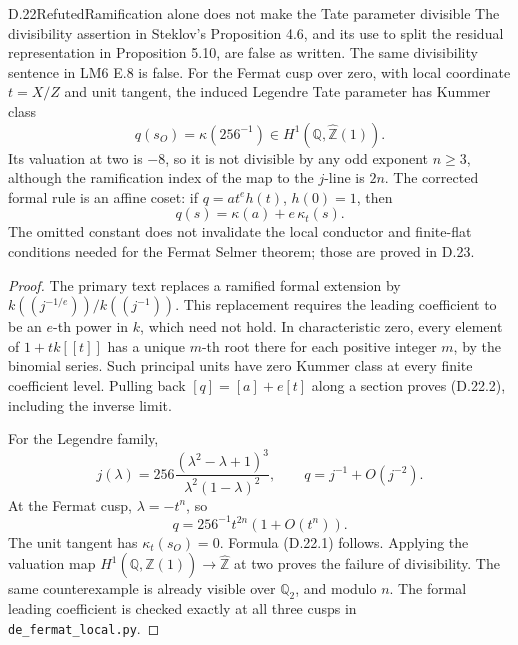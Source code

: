 \begin{statement}{D.22}{Refuted}{Ramification alone does not make the Tate parameter divisible}
The divisibility assertion in Steklov's Proposition 4.6,
and its use to split the residual representation in
Proposition 5.10, are false as written. The same
divisibility sentence in LM6 E.8 is false.
For the Fermat cusp over zero, with local coordinate
\(t=X/Z\) and unit tangent, the induced Legendre
Tate parameter has Kummer class
\[
       q(s_O)=\kappa(256^{-1})
          \in H^1(\mathbb Q,\widehat{\mathbb Z}(1)).  \tag{D.22.1}
\]
Its valuation at two is \(-8\), so it is not divisible
by any odd exponent \(n\ge3\), although the ramification
index of the map to the \(j\)-line is \(2n\).
The corrected formal rule is an affine coset:
if \(q=a t^e h(t)\), \(h(0)=1\), then
\[
          q(s)=\kappa(a)+e\,\kappa_t(s).              \tag{D.22.2}
\]
The omitted constant does not invalidate the local
conductor and finite-flat conditions needed for the
Fermat Selmer theorem; those are proved in D.23.
\end{statement}
\begin{proof}
The primary text \cite[Propositions 4.6 and 5.10]{DE_Steklov2026}
replaces a ramified formal extension by
\(k((j^{-1/e}))/k((j^{-1}))\). This replacement requires
the leading coefficient to be an \(e\)-th power in
\(k\), which need not hold. In characteristic zero,
every element of \(1+t k[[t]]\) has a unique \(m\)-th
root there for each positive integer \(m\), by the
binomial series. Such principal units have zero
Kummer class at every finite coefficient level.
Pulling back \([q]=[a]+e[t]\) along a section proves
(D.22.2), including the inverse limit.

For the Legendre family,
\[
 j(\lambda)=256\frac{(\lambda^2-\lambda+1)^3}
                         {\lambda^2(1-\lambda)^2},
 \qquad q=j^{-1}+O(j^{-2}).
\]
At the Fermat cusp, \(\lambda=-t^n\), so
\[
       q=256^{-1}t^{2n}(1+O(t^n)).                   \tag{D.22.3}
\]
The unit tangent has \(\kappa_t(s_O)=0\). Formula
(D.22.1) follows. Applying the valuation map
\(H^1(\mathbb Q,\widehat{\mathbb Z}(1))
\to\widehat{\mathbb Z}\) at two proves the failure
of divisibility. The same counterexample is already
visible over \(\mathbb Q_2\), and modulo \(n\).
The formal leading coefficient is checked exactly
at all three cusps in \texttt{de\_fermat\_local.py}.
\end{proof}

